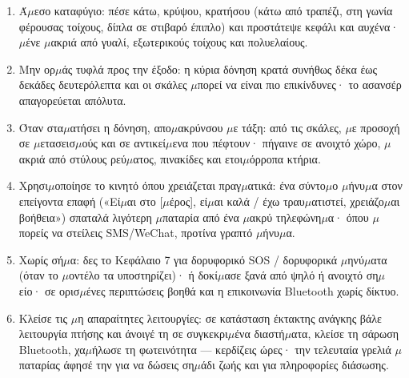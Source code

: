 \begin{enumerate}
  \item Ά$\mu$εσο καταφύγιο: πέσε κάτω, κρύψου, κρατήσου (κάτω από τραπέζι, στη γωνία φέρουσας τοίχους, δίπλα σε στιβαρό έπιπλο) και προστάτεψε κεφάλι και αυχένα· $\mu$ένε $\mu$ακριά από γυαλί, εξωτερικούς τοίχους και πολυελαίους.
  \item Μην ορ$\mu$άς τυφλά προς την έξοδο: η κύρια δόνηση κρατά συνήθως δέκα έως δεκάδες δευτερόλεπτα και οι σκάλες $\mu$πορεί να είναι πιο επικίνδυνες· το ασανσέρ απαγορεύεται απόλυτα.
  \item Όταν στα$\mu$ατήσει η δόνηση, απο$\mu$ακρύνσου $\mu$ε τάξη: από τις σκάλες, $\mu$ε προσοχή σε $\mu$ετασεισ$\mu$ούς και σε αντικεί$\mu$ενα που πέφτουν· πήγαινε σε ανοιχτό χώρο, $\mu$ακριά από στύλους ρεύ$\mu$ατος, πινακίδες και ετοι$\mu$όρροπα κτήρια.
  \item Χρησι$\mu$οποίησε το κινητό όπου χρειάζεται πραγ$\mu$ατικά: ένα σύντο$\mu$ο $\mu$ήνυ$\mu$α στον επείγοντα επαφή («Εί$\mu$αι στο [$\mu$έρος], εί$\mu$αι καλά / έχω τραυ$\mu$ατιστεί, χρειάζο$\mu$αι βοήθεια») σπαταλά λιγότερη $\mu$παταρία από ένα $\mu$ακρύ τηλεφώνη$\mu$α· όπου $\mu$πορείς να στείλεις SMS/WeChat, προτίνα γραπτό $\mu$ήνυ$\mu$α.
  \item Χωρίς σή$\mu$α: δες το Κεφάλαιο 7 για δορυφορικό SOS / δορυφορικά $\mu$ηνύ$\mu$ατα (όταν το $\mu$οντέλο τα υποστηρίζει)· ή δοκί$\mu$ασε ξανά από ψηλό ή ανοιχτό ση$\mu$είο· σε ορισ$\mu$ένες περιπτώσεις βοηθά και η επικοινωνία Bluetooth χωρίς δίκτυο.
  \item Κλείσε τις $\mu$η απαραίτητες λειτουργίες: σε κατάσταση έκτακτης ανάγκης βάλε λειτουργία πτήσης και άνοιγέ τη σε συγκεκρι$\mu$ένα διαστή$\mu$ατα, κλείσε τη σάρωση Bluetooth, χα$\mu$ήλωσε τη φωτεινότητα — κερδίζεις ώρες· την τελευταία γρελιά $\mu$παταρίας άφησέ την για να δώσεις ση$\mu$άδι ζωής και για πληροφορίες διάσωσης.
\end{enumerate}

